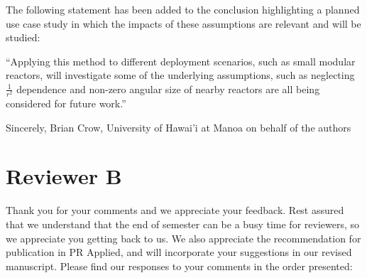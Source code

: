 The following statement has been added to the conclusion highlighting a planned use case study in which the impacts of these assumptions are relevant and will be studied:

``Applying this method to different deployment scenarios, such as small modular reactors, will investigate some of the underlying assumptions, such as neglecting \(\frac{1}{r^2}\) dependence and non-zero angular size of nearby reactors are all being considered for future work.''

Sincerely,
Brian Crow, University of Hawai'i at Manoa%
on behalf of the authors

\section{Reviewer B}

Thank you for your comments and we appreciate your feedback. Rest assured that we understand that the end of semester can be a busy time for reviewers, so we appreciate you getting back to us. We also appreciate the recommendation for publication in PR Applied, and will incorporate your suggestions in our revised manuscript. Please find our responses to your comments in the order presented:

